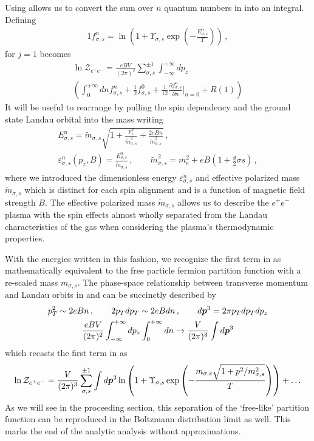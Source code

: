 Using  allows us to convert the sum over $n$ quantum numbers in  into an integral. Defining
\begin{alignat}{1}
    \label{Func} f_{\sigma,s}^{n}=\ln\left(1+\Upsilon_{\sigma,s}\exp\left(-\frac{E_{\sigma,s}^{n}}{T}\right)\right)\,,
\end{alignat}
 for $j=1$ becomes
\begin{multline}
    \label{PartFuncTwo} \ln\mathcal{Z}_{e^{+}e^{-}} = \frac{e{B}V}{(2\pi)^{2}}\sum_{\sigma,s}^{\pm1}\int_{-\infty}^{+\infty}dp_{z}\\
    \left(\int_{0}^{+\infty}dn f_{\sigma,s}^{n} + \frac{1}{2}f_{\sigma,s}^{0} + \frac{1}{12}\frac{\partial f_{\sigma,s}^{n}}{\partial n}\bigg\rvert_{n=0} + R(1)\right)
\end{multline}
It will be useful to rearrange  by pulling the spin dependency and the ground state Landau orbital into the mass writing
\begin{gather}
 \label{effmass:1}
 E^{n}_{\sigma,s}={\tilde m}_{\sigma,s}\sqrt{1+\frac{p_{z}^{2}}{{\tilde m}_{\sigma,s}^{2}}+\frac{2e{B}n}{{\tilde m}_{\sigma,s}^{2}}}\,,\\
 \label{effmass:2}
 \varepsilon_{\sigma,s}^{n}(p_{z},{B})=\frac{E_{\sigma,s}^{n}}{{\tilde m}_{\sigma,s}}\,,\qquad{\tilde m}_{\sigma,s}^{2}=m_{e}^{2}+e{B}\left(1+\frac{g}{2}\sigma s\right)\,,
\end{gather}
where we introduced the dimensionless energy $\varepsilon^{n}_{\sigma,s}$ and effective polarized mass ${\tilde m}_{\sigma,s}$ which is distinct for each spin alignment and is a function of magnetic field strength ${B}$. The effective polarized mass ${\tilde m}_{\sigma,s}$ allows us to describe the $e^{+}e^{-}$ plasma with the spin effects almost wholly separated from the Landau characteristics of the gas when considering the plasma's thermodynamic properties.

With the energies written in this fashion, we recognize the first term in  as mathematically equivalent to the free particle fermion partition function with a re-scaled mass $m_{\sigma,s}$. The phase-space relationship between transverse momentum and Landau orbits in  and  can be succinctly described by
\begin{gather}
    p_{T}^{2} \sim 2eBn\,,\qquad2p_{T}dp_{T} \sim 2eBdn\,,\qquad d\boldsymbol{p}^{3}=2\pi p_{T}dp_{T}dp_{z}\\
    \frac{eBV}{(2\pi)^{2}}\int_{-\infty}^{+\infty}dp_{z}\int_{0}^{+\infty}dn \rightarrow \frac{V}{(2\pi)^{3}}\int d\boldsymbol{p}^{3}
\end{gather}
which recasts the first term in  as
\begin{align}
    \ln\mathcal{Z}_{e^{+}e^{-}} = \frac{V}{(2\pi)^{3}}\sum_{\sigma,s}^{\pm1}\int d\boldsymbol{p}^{3}\ln\left(1+\Upsilon_{\sigma,s}\exp{\left(-\frac{m_{\sigma,s}\sqrt{1+p^{2}/m_{\sigma,s}^{2}}}{T}\right)}\right)+\ldots
\end{align}
As we will see in the proceeding section, this separation of the `free-like' partition function can be reproduced in the Boltzmann distribution limit as well. This marks the end of the analytic analysis without approximations.

